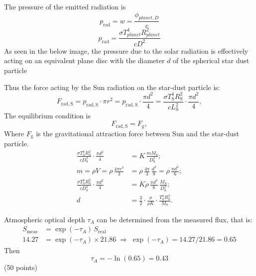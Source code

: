 The pressure of the emitted radiation is
\[ p_{\mathrm{rad}} = w = \frac{\phi_{planet,D}}{c} \]
\[ p_{\mathrm{rad}}
   = \frac{\sigma T_{planet}^4 R_{planet}^2}{cD^2} \tag*{(1)} \]
As seen in the below image, the pressure due to the solar radiation is
effectively acting on an equivalent plane disc with the diameter $d$ of the
spherical star dust particle

Thus the force acting by the Sun radiation on the star-dust particle is:
\[ F_{\mathrm{rad,S}} = p_{\mathrm{rad,S}}\cdot\pi r^2
   = p_{\mathrm{rad,S}}\cdot\frac{\pi d^2}{4}
   = \frac{\sigma T_{\mathrm{S}}^4 R_{\mathrm{S}}^2}{cL_{\mathrm{S}}^2}
     \cdot\frac{\pi d^2}{4}, \]
The equilibrium condition is
\[ F_{\mathrm{rad,S}} = F_{\mathrm{g}}, \]
Where $F_{\mathrm{g}}$ is the gravitational attraction force between Sun and
the star-dust particle.
\begin{align*}
\frac{\sigma T_{\mathrm{S}}^4 R_{\mathrm{S}}^2}{cD_{\mathrm{S}}^2}
  \cdot\frac{\pi d^2}{4}
  &= K\,\frac{m M_{\mathrm{S}}}{D_{\mathrm{S}}^2};\\
m = \rho V = \rho\,\frac{4\pi r^3}{3}
  &= \rho\,\frac{4\pi}{3}\,\frac{d^3}{8}
   = \rho\,\frac{\pi d^3}{6};\\
\frac{\sigma T_{\mathrm{S}}^4 R_{\mathrm{S}}^2}{cD_{\mathrm{S}}^2}
  \cdot\frac{\pi d^2}{4}
  &= K\rho\,\frac{\pi d^3}{6}\,\frac{M_{\mathrm{S}}}{D_{\mathrm{S}}^2};\\
d &= \frac{3}{2}\cdot\frac{\sigma}{\rho K}\cdot
     \frac{T_{\mathrm{S}}^4 R_{\mathrm{S}}^2}{M_{\mathrm{S}}}.
\end{align*}

Atmospheric optical depth $\tau_A$ can be determined from the measured flux,
that is:
\begin{align*}
S_{\mathrm{meas}} &= \exp(-\tau_A)\, S_{\mathrm{real}}\\
14.27 &= \exp(-\tau_A) \times 21.86
  \;\Rightarrow\; \exp(-\tau_A) = 14.27/21.86 = 0.65
\end{align*}
Then
\[ \tau_A = -\ln(0.65) = 0.43 \]
\hfill(50 points)

